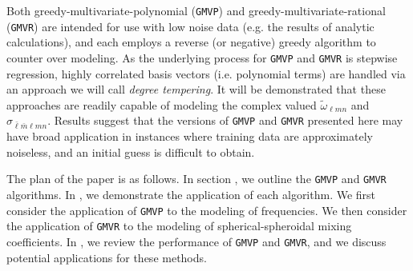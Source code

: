 \documentclass[twocolumn,aps,prd,floatfix,preprintnumbers,a4paper,nofootinbib,
superscriptaddress,10pt]{revtex4-1}
\newcommand{\cw}{\tilde{\omega}}
\def\lmn{_{\ell m n}}
\def\LMlmn{_{\bar{\ell} \bar{m} \ell m n}}
\def\gmvp#1{greedy-multivariate-polynomial#1
  (\texttt{GMVP}#1)\gdef\gmvp{\texttt{GMVP}}}
\def\gmvr#1{greedy-multivariate-rational#1
  (\texttt{GMVR}#1)\gdef\gmvr{\texttt{GMVR}}}
\begin{document}
%
Both \gmvp{} and \gmvr{} are intended for use with low noise data (e.g. the results of analytic calculations), and each employs a reverse (or negative) greedy algorithm to counter over modeling.
%
As the underlying process for \gmvp{} and \gmvr{} is stepwise regression, highly correlated basis vectors (i.e. polynomial terms) are handled via an approach we will call \textit{degree tempering}.
%
It will be demonstrated that these approaches are readily capable of modeling the complex valued $\cw\lmn$ and $\sigma\LMlmn$.
%
Results suggest that the versions of \gmvp{} and \gmvr{} presented here may have broad application in instances where training data are approximately noiseless, and an initial guess is difficult to obtain.
%
%
\par The plan of the paper is as follows.
%
In section , we outline the \gmvp{} and \gmvr{} algorithms.
%
In , we demonstrate the application of each algorithm.
%
We first consider the application of \gmvp{} to the modeling of \qnm{} frequencies.
%
We then consider the application of \gmvr{} to the modeling of spherical-spheroidal mixing coefficients.
%
In , we review the performance of \gmvp{} and \gmvr{}, and we discuss potential applications for these methods.

%
\end{document}
